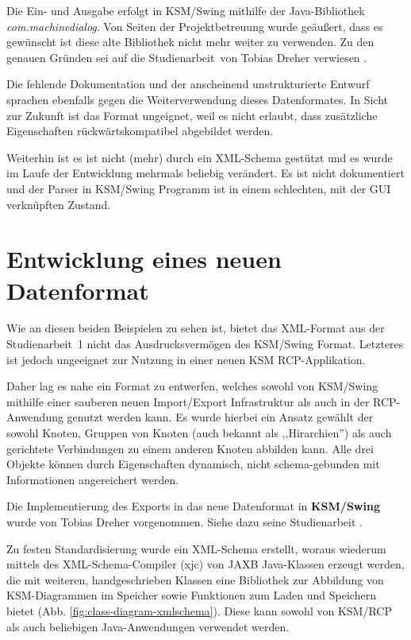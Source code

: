 \documentclass[%
12pt,titlepage,abstracton,DIV=10,BCOR=0.5cm]{scrreprt}
\begin{document}
Die Ein- und Ausgabe erfolgt in KSM/Swing mithilfe der Java-Bibliothek
\textit{com.\-machine\-dialog}. Von Seiten der Projektbetreuung wurde geäußert,
dass es gewünscht ist diese alte Bibliothek nicht mehr weiter zu verwenden. Zu den
genauen Gründen sei auf die Studienarbeit\, von Tobias Dreher
verwiesen \cite[S. 24]{dreher10}.

Die fehlende Dokumentation und der anscheinend unstrukturierte Entwurf sprachen
ebenfalls gegen die Weiterverwendung dieses Datenformates.
In Sicht zur Zukunft ist das Format ungeignet, weil es nicht erlaubt, dass
zusätzliche Eigenschaften rückwärtskompatibel abgebildet werden.

Weiterhin ist es ist nicht (mehr) durch ein XML-Schema gestützt und es wurde im
Laufe der Entwicklung mehrmals beliebig verändert. Es ist nicht dokumentiert und
der Parser in KSM/Swing Programm ist in einem schlechten, mit der GUI
verknüpften Zustand.

\section{Entwicklung eines neuen Datenformat}
Wie an diesen beiden Beispielen zu sehen ist, bietet das XML-Format aus der
Studienarbeit~1 nicht das Ausdrucksvermögen des KSM/Swing Format. Letzteres ist
jedoch ungeeignet zur Nutzung in einer neuen KSM RCP-Applikation.

Daher lag es nahe ein Format zu entwerfen, welches sowohl von KSM/Swing mithilfe
einer sauberen neuen Import/Export Infrastruktur als auch in der RCP-Anwendung
genutzt werden kann. Es wurde hierbei ein Ansatz gewählt der sowohl Knoten,
Gruppen von Knoten (auch bekannt als ,,Hirarchien'') als auch gerichtete
Verbindungen zu einem anderen Knoten abbilden kann. Alle drei Objekte können
durch Eigenschaften dynamisch, nicht schema-gebunden mit Informationen
angereichert werden.

\par \begingroup \leftskip=1.5cm %
\noindent

Die Implementierung des Exports in das neue Datenformat in \textbf{KSM/Swing}
wurde von Tobias Dreher vorgenommen. Siehe dazu seine Studienarbeit
\cite{dreher11}. \par

\endgroup

Zu festen Standardisierung wurde ein XML-Schema erstellt, woraus wiederum
mittels des XML-Schema-Compiler (xjc) von JAXB Java-Klassen erzeugt werden, die
mit weiteren, handgeschrieben Klassen eine Bibliothek zur Abbildung von
KSM-Diagrammen im Speicher sowie Funktionen zum Laden und Speichern bietet (Abb.
\ref{fig:class-diagram-xmlschema}). Diese kann sowohl von KSM/RCP als auch
beliebigen Java-Anwendungen verwendet werden.
\end{document}
